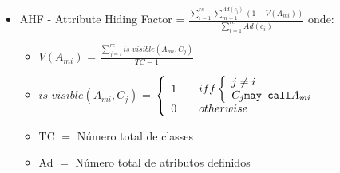 \begin{description}
\begin{itemize}
\begin{itemize}
\begin{array}{l l}
																									      1 & \quad iff \left \{ \begin{array}{l l}
																									                              j \neq i \\
																												      C_j \texttt{may call} M_{mi}\\
																									                             \end{array}
\right.\\
																									      0 & \quad otherwise\\
																									    \end{array} \right. \)
																				      \item TC $=$ Número total de classes
																				      \item Md $=$ Número total de métodos definidos
																				      \item $V(M_{mi})$ $=$ A visibilidade de todas as classes onde o método $M_{mi}$ é visível
																				      \item MHF é então a medida do uso de informação através de métodos
																				    \end{itemize}
				   \item AHF - Attribute Hiding Factor = $ \frac{\sum_{i=1}^{rc} \sum_{m=1}^{Ad(c_i)} (1-V(A_{mi}))} {\sum_{i=1}^{rc} Ad(c_i)} $ onde: \begin{itemize}
																				      \item $V(A_{mi})$ = $\frac{\sum_{j=i}^{rc} is\_visible(A_{mi},C_j)}{TC-1} $
																				      \item $ is\_visible(A_{mi},C_j) $ = \( \left \{ \begin{array}{l l}
																									      1 & \quad iff \left \{ \begin{array}{l l}
																									                              j \neq i \\
																												      C_j \texttt{may call} A_{mi}\\
																									                             \end{array}
\right.\\
																									      0 & \quad otherwise\\
																									    \end{array} \right. \)
																				      \item TC $=$ Número total de classes
																				      \item Ad $=$ Número total de atributos definidos

\end{itemize}
\end{itemize}
\end{description}
